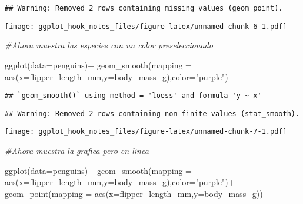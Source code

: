 \documentclass[
]{article}
\newenvironment{Shaded}{\begin{snugshade}}{\end{snugshade}}
\newcommand{\AttributeTok}[1]{\textcolor[rgb]{0.77,0.63,0.00}{#1}}
\newcommand{\CommentTok}[1]{\textcolor[rgb]{0.56,0.35,0.01}{\textit{#1}}}
\newcommand{\FunctionTok}[1]{\textcolor[rgb]{0.00,0.00,0.00}{#1}}
\newcommand{\NormalTok}[1]{#1}
\newcommand{\SpecialCharTok}[1]{\textcolor[rgb]{0.00,0.00,0.00}{#1}}
\newcommand{\StringTok}[1]{\textcolor[rgb]{0.31,0.60,0.02}{#1}}
\begin{document}
\begin{verbatim}
## Warning: Removed 2 rows containing missing values (geom_point).
\end{verbatim}

\texttt{[image: ggplot\_hook\_notes\_files/figure-latex/unnamed-chunk-6-1.pdf]}

\begin{Shaded}
\begin{Highlighting}[]
\CommentTok{\#Ahora muestra las especies con un color preseleccionado}
\end{Highlighting}
\end{Shaded}

\begin{Shaded}
\begin{Highlighting}[]
\FunctionTok{ggplot}\NormalTok{(}\AttributeTok{data=}\NormalTok{penguins)}\SpecialCharTok{+}
  \FunctionTok{geom\_smooth}\NormalTok{(}\AttributeTok{mapping =} \FunctionTok{aes}\NormalTok{(}\AttributeTok{x=}\NormalTok{flipper\_length\_mm,}\AttributeTok{y=}\NormalTok{body\_mass\_g),}\AttributeTok{color=}\StringTok{"purple"}\NormalTok{)}
\end{Highlighting}
\end{Shaded}

\begin{verbatim}
## `geom_smooth()` using method = 'loess' and formula 'y ~ x'
\end{verbatim}

\begin{verbatim}
## Warning: Removed 2 rows containing non-finite values (stat_smooth).
\end{verbatim}

\texttt{[image: ggplot\_hook\_notes\_files/figure-latex/unnamed-chunk-7-1.pdf]}

\begin{Shaded}
\begin{Highlighting}[]
\CommentTok{\#Ahora muestra la grafica pero en linea}
\end{Highlighting}
\end{Shaded}

\begin{Shaded}
\begin{Highlighting}[]
\FunctionTok{ggplot}\NormalTok{(}\AttributeTok{data=}\NormalTok{penguins)}\SpecialCharTok{+}
  \FunctionTok{geom\_smooth}\NormalTok{(}\AttributeTok{mapping =} \FunctionTok{aes}\NormalTok{(}\AttributeTok{x=}\NormalTok{flipper\_length\_mm,}\AttributeTok{y=}\NormalTok{body\_mass\_g),}\AttributeTok{color=}\StringTok{"purple"}\NormalTok{)}\SpecialCharTok{+}
  \FunctionTok{geom\_point}\NormalTok{(}\AttributeTok{mapping =} \FunctionTok{aes}\NormalTok{(}\AttributeTok{x=}\NormalTok{flipper\_length\_mm,}\AttributeTok{y=}\NormalTok{body\_mass\_g)) }
\end{Highlighting}
\end{Shaded}
\end{document}
